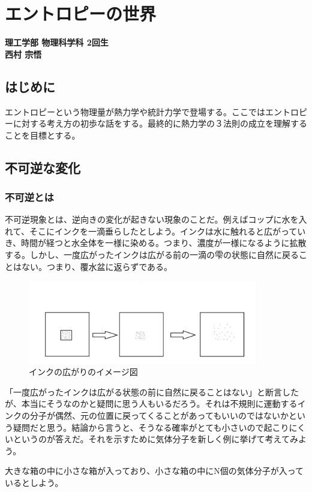 
\chapter{エントロピーの世界}
\vspace{-45pt} %
\begin{flushright}
  {\bf \large 理工学部 物理科学科 2回生} \\ \vspace{3pt} %
  {\bf \large 西村 宗悟} \\ \vspace{30pt} %
\end{flushright}

\section*{はじめに}
エントロピーという物理量が熱力学や統計力学で登場する。ここではエントロピーに対する考え方の初歩な話をする。最終的に熱力学の３法則の成立を理解することを目標とする。

%
\section{不可逆な変化}\label{sec:hukagyaku}
%
\subsection{不可逆とは}
不可逆現象とは、逆向きの変化が起きない現象のことだ。例えばコップに水を入れて、そこにインクを一滴垂らしたとしよう。インクは水に触れると広がっていき、時間が経つと水全体を一様に染める。つまり、濃度が一様になるように拡散する。しかし、一度広がったインクは広がる前の一滴の雫の状態に自然に戻ることはない。つまり、覆水盆に返らずである。\par\begin{figure}[H]
  \centering
  \includegraphics[width=10cm]{nishimura/image/2017112201.png}
  \caption{インクの広がりのイメージ図}
\end{figure}

「一度広がったインクは広がる状態の前に自然に戻ることはない」と断言したが、本当にそうなのかと疑問に思う人もいるだろう。それは不規則に運動するインクの分子が偶然、元の位置に戻ってくることがあってもいいのではないかという疑問だと思う。結論から言うと、そうなる確率がとても小さいので起こりにくいというのが答えだ。それを示すために気体分子を新しく例に挙げて考えてみよう。\par
大きな箱の中に小さな箱が入っており、小さな箱の中にN個の気体分子が入っているとしよう。\\

